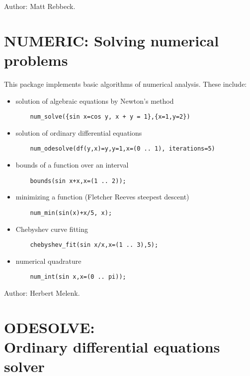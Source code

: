 Author: Matt Rebbeck.


\newpage

\section{NUMERIC: Solving numerical problems}
This package implements basic algorithms of numerical analysis.
These include:
\begin{itemize}
\item solution of algebraic equations by Newton's method
\begin{verbatim}
    num_solve({sin x=cos y, x + y = 1},{x=1,y=2})
\end{verbatim}
\item solution of ordinary differential equations
\begin{verbatim}
    num_odesolve(df(y,x)=y,y=1,x=(0 .. 1), iterations=5)
\end{verbatim}
\item bounds of a function over an interval
\begin{verbatim}
    bounds(sin x+x,x=(1 .. 2));
\end{verbatim}
\item minimizing a function (Fletcher Reeves steepest descent)
\begin{verbatim}
    num_min(sin(x)+x/5, x);
\end{verbatim}
\item Chebyshev curve fitting
\begin{verbatim}
    chebyshev_fit(sin x/x,x=(1 .. 3),5);
\end{verbatim}
\item numerical quadrature
\begin{verbatim}
    num_int(sin x,x=(0 .. pi));
\end{verbatim}
\end{itemize}

Author: Herbert Melenk.


\newpage

\section[ODESOLVE: Ordinary differential equations solver]%
        {ODESOLVE: \protect\\ Ordinary differential equations solver}

